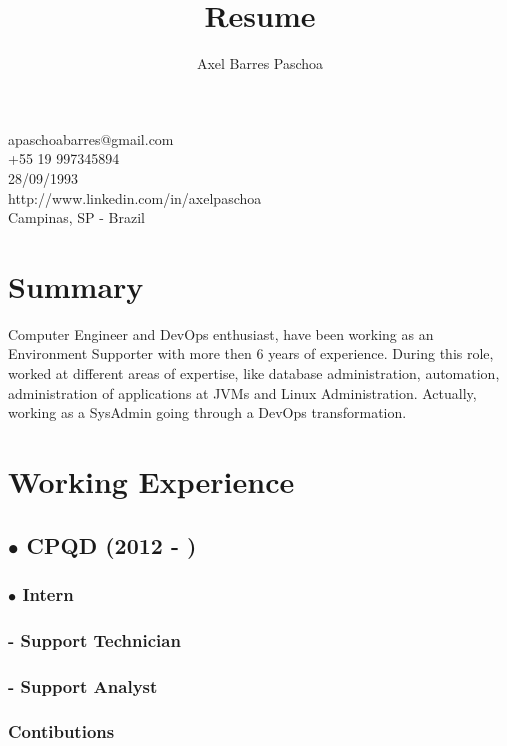 \documentclass{article}
\makeatletter
\renewcommand{\maketitle}{

\begin{center}

{\huge\bfseries\theauthor}

apaschoabarres@gmail.com \\
+55 19 997345894 \\
28/09/1993 \\
http://www.linkedin.com/in/axelpaschoa \\
Campinas, SP - Brazil
\end{center}
}
\makeatother
\begin{document}
\title{Resume}
\author{Axel Barres Paschoa}

\maketitle

\section{Summary}

Computer Engineer and DevOps enthusiast, have been working as an Environment Supporter with more then 6 years of experience. During this role, worked at different areas of expertise, like database administration, automation, administration of applications at JVMs and Linux Administration. Actually, working as a SysAdmin going through a DevOps transformation.


\section{Working Experience}

\subsection{$\bullet$ CPQD (2012 - )}

\subsubsection{$\bullet$ Intern}

\subsubsection{- Support Technician}

\subsubsection{- Support Analyst \\}

\subsubsection{Contibutions \\}
\end{document}

